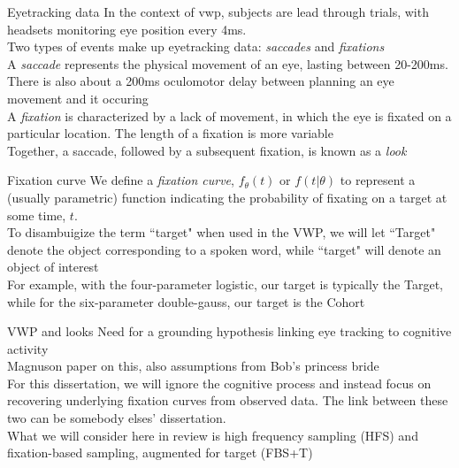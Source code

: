 \documentclass{beamer}
\begin{document}
\begin{frame}{Eyetracking data}
In the context of vwp, subjects are lead through trials, with headsets monitoring eye position every 4ms. \newline \\

Two types of events make up eyetracking data: \textit{saccades} and \textit{fixations} \newline \\

A \textit{saccade} represents the physical movement of an eye, lasting between 20-200ms. There is also about a 200ms oculomotor delay between planning an eye movement and it occuring \newline \\

A \textit{fixation} is characterized by a lack of movement, in which the eye is fixated on a particular location. The length of a fixation is more  variable \newline \\

Together, a saccade, followed by a subsequent fixation, is known as a \textit{look}
\end{frame}

\begin{frame}{Fixation curve}
We define a \textit{fixation curve}, $f_{\theta}(t)$ or $f(t  | \theta)$ to represent a (usually parametric) function indicating the probability of fixating on a target at some time, $t$. \newline \\
To disambuigize the term ``target" when used in the VWP, we will let ``Target" denote the object corresponding to a spoken word, while ``target" will denote an object of interest \newline \\

For example, with the four-parameter logistic, our target is typically the Target, while for the six-parameter double-gauss, our target is the Cohort
\end{frame}

\begin{frame}{VWP and looks}
Need for a grounding hypothesis linking eye tracking to cognitive activity \newline \\

Magnuson paper on this, also assumptions from Bob's princess bride \newline \\

For this dissertation, we will ignore the cognitive process and instead focus on recovering underlying fixation curves from observed data. The link between these two can be somebody elses' dissertation. \newline \\

What we will consider here in review is high frequency sampling (HFS) and fixation-based sampling, augmented for target (FBS+T)

\end{frame}
\end{document}
